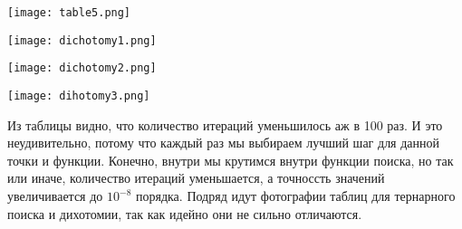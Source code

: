 \documentclass[12pt]{article}
\begin{document}
\begin{center}

\centering

\texttt{[image: table5.png]}


\label{fig:mpr}

\end{center}



\begin{center}

\centering

\texttt{[image: dichotomy1.png]}


\label{fig:mpr}

\end{center}


\begin{center}

\centering

\texttt{[image: dichotomy2.png]}


\label{fig:mpr}

\end{center}



\begin{center}

\centering

\texttt{[image: dihotomy3.png]}


\label{fig:mpr}

\end{center}


Из таблицы видно, что количество итераций уменьшилось аж в 100 раз. И это неудивительно, потому что каждый раз мы выбираем лучший шаг для данной точки и функции. Конечно, внутри мы крутимся внутри функции поиска, но так или иначе, количество итераций уменьшается, а точноссть значений увеличивается до $10^{-8}$ порядка. Подряд идут фотографии таблиц для тернарного поиска и дихотомии, так как идейно они не сильно отличаются.
\end{document}
